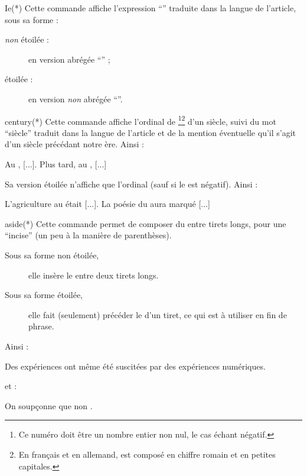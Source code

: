 \begin{docCommand}{Ie(*)}{}
  Cette commande affiche l'expression \enquote{\Ie*{}} traduite dans la langue
  de l'article, sous sa forme :
  \begin{description}
  \item[\emph{non} étoilée :] en version abrégée \enquote{\Ie{}} ;
  \item[étoilée :] en version \emph{non} abrégée \enquote{\Ie*{}}.
  \end{description}
\end{docCommand}

\begin{docCommand}{century(*)}{}
  Cette commande affiche l'ordinal de \footnote{Ce numéro doit être
    un nombre entier non nul, le cas échant négatif.}\footnote{En français et en
    allemand,  est composé en chiffre romain et en petites
    capitales.} d'un siècle, suivi du mot \enquote{siècle} traduit dans la
  langue de l'article et de la mention éventuelle qu'il s'agit d'un siècle
  précédant notre ère. Ainsi :
\begin{bodycode}
Au , [...]. Plus tard, au , [...]
\end{bodycode}
  Sa version étoilée n'affiche que l'ordinal (sauf si le  est
  négatif). Ainsi :
\begin{bodycode}
L'agriculture au  était [...].
La poésie du  aura marqué [...]
\end{bodycode}
\end{docCommand}

\begin{docCommand}{aside(*)}{}
  Cette commande permet de composer du  entre tirets longs, pour une
  \enquote{incise} (un peu à la manière de parenthèses).
  \begin{description}
  \item[Sous sa forme non étoilée,] elle insère le  entre deux
    tirets longs.
  \item[Sous sa forme étoilée,] elle fait (seulement) précéder le 
    d'un tiret, ce qui est à utiliser en fin de phrase.
  \end{description}
  Ainsi :
\begin{bodycode}
Des expériences  ont même été
suscitées par des expériences numériques.
\end{bodycode}
  et :
\begin{bodycode}[listing and text,listing options={deletekeywords={exemple}}]
On soupçonne que non .
\end{bodycode}
\end{docCommand}

